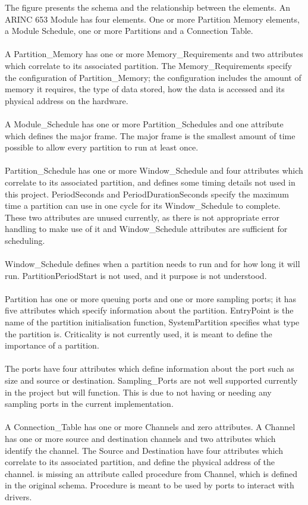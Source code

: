 The figure presents the schema and the
relationship between the elements.
An ARINC 653 Module has four elements.
One or more Partition Memory elements,
a Module Schedule, one or more Partitions and a Connection Table.
\\\\
A Partition\_Memory has one or more
Memory\_Requirements and two attributes which correlate
to its associated partition. The Memory\_Requirements
specify the configuration of Partition\_Memory;
the configuration includes the amount of memory it requires,
the type of data stored, how the data is accessed
and its physical address on the hardware.
\\\\
A Module\_Schedule has one or more
Partition\_Schedules and one attribute which defines
the major frame. The major frame is the smallest
amount of time possible to allow every partition to
run at least once.
\\\\
Partition\_Schedule has one or
more Window\_Schedule and four attributes which correlate
to its associated partition, and defines some timing details
not used in this project. PeriodSeconds and PeriodDurationSeconds
specify the maximum time a partition can use in one cycle for
its Window\_Schedule to complete. These two attributes are unused currently, as
there is not appropriate error handling to make use of it and
Window\_Schedule attributes are sufficient for scheduling.
\\\\
Window\_Schedule defines when a partition needs to run and
for how long it will run. PartitionPeriodStart is not used,
and it purpose is not understood.
\\\\
Partition has one or more queuing ports and one or more
sampling ports; it has five attributes which specify
information about the partition. EntryPoint is the name
of the partition initialisation function, SystemPartition
specifies what type the partition is. Criticality is not
currently used, it is meant to define the importance of a
partition.
\\\\
The ports have four attributes which define information
about the port such as size and source or destination.
Sampling\_Ports are not well supported currently in the
project but will function. This is due to not having or
needing any sampling ports in the current implementation.
\\\\
A Connection\_Table has one or more Channels and zero attributes.
A Channel has one or more source and destination channels and two
attributes which identify the channel. The Source and
Destination have four attributes which correlate
to its associated partition, and define the physical address
of the channel.
\OSname{} is missing an attribute called procedure from Channel,
which is defined in the original \arinc{} schema.
Procedure is meant to be used by ports to interact with drivers.


